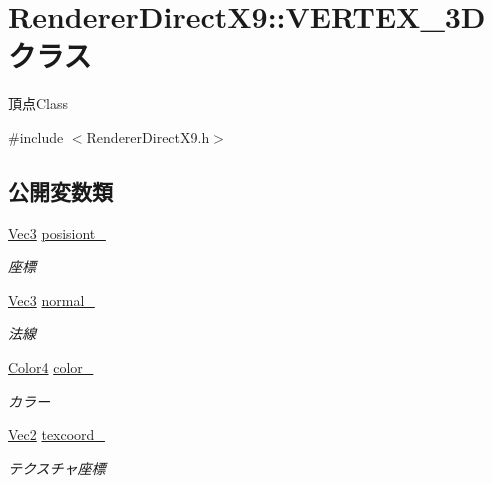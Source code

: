 \hypertarget{class_renderer_direct_x9_1_1_v_e_r_t_e_x__3_d}{}\section{Renderer\+Direct\+X9\+:\+:V\+E\+R\+T\+E\+X\+\_\+3D クラス}
\label{class_renderer_direct_x9_1_1_v_e_r_t_e_x__3_d}


頂点\+Class  




{\ttfamily \#include $<$Renderer\+Direct\+X9.\+h$>$}

\subsection*{公開変数類}
\begin{DoxyCompactItemize}
\item 
\mbox{\hyperlink{_vector3_d_8h_ab16f59e4393f29a01ec8b9bbbabbe65d}{Vec3}} \mbox{\hyperlink{class_renderer_direct_x9_1_1_v_e_r_t_e_x__3_d_a15e30709ae06aa5bc8e73054e9f160e9}{posisiont\+\_\+}}
\begin{DoxyCompactList}\small\item\em 座標 \end{DoxyCompactList}\item 
\mbox{\hyperlink{_vector3_d_8h_ab16f59e4393f29a01ec8b9bbbabbe65d}{Vec3}} \mbox{\hyperlink{class_renderer_direct_x9_1_1_v_e_r_t_e_x__3_d_a14a5a2f215062bb76fc69daa45160904}{normal\+\_\+}}
\begin{DoxyCompactList}\small\item\em 法線 \end{DoxyCompactList}\item 
\mbox{\hyperlink{_vector3_d_8h_a9c2339f516cf07ce4753b8a99fab3791}{Color4}} \mbox{\hyperlink{class_renderer_direct_x9_1_1_v_e_r_t_e_x__3_d_ac81f0059a82d7005a8bd3cfb189cb277}{color\+\_\+}}
\begin{DoxyCompactList}\small\item\em カラー \end{DoxyCompactList}\item 
\mbox{\hyperlink{_vector3_d_8h_a5ef6e95dfc5f9d3820b71772d99bbc25}{Vec2}} \mbox{\hyperlink{class_renderer_direct_x9_1_1_v_e_r_t_e_x__3_d_a240251febb14de7b0a6525d3b305f516}{texcoord\+\_\+}}
\begin{DoxyCompactList}\small\item\em テクスチャ座標 \end{DoxyCompactList}\end{DoxyCompactItemize}


